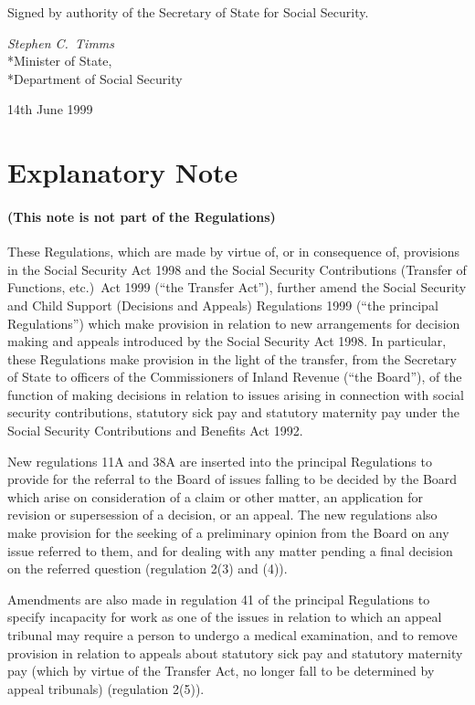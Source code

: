 \documentclass[12pt,a4paper]{article}
\begin{document}

\bigskip

Signed 
by authority of the Secretary of State for Social Security.

{\raggedleft
\emph{Stephen C.\ Timms
}\\*Minister of State,\\*Department of Social Security

}

14th June 1999

\small

\part{Explanatory Note}

\renewcommand\parthead{--- Explanatory Note}

\subsection*{(This note is not part of the Regulations)}

These Regulations, which are made by virtue of, or in consequence of, provisions in the Social Security Act 1998 and the Social Security Contributions (Transfer of Functions, etc.)\ Act 1999 (“the Transfer Act”), further amend the Social Security and Child Support (Decisions and Appeals) Regulations 1999 (“the principal Regulations”) which make provision in relation to new arrangements for decision making and appeals introduced by the Social Security Act 1998. In particular, these Regulations make provision in the light of the transfer, from the Secretary of State to officers of the Commissioners of Inland Revenue (“the Board”), of the function of making decisions in relation to issues arising in connection with social security contributions, statutory sick pay and statutory maternity pay under the Social Security Contributions and Benefits Act 1992.

New regulations 11A and 38A are inserted into the principal Regulations to provide for the referral to the Board of issues falling to be decided by the Board which arise on consideration of a claim or other matter, an application for revision or supersession of a decision, or an appeal. The new regulations also make provision for the seeking of a preliminary opinion from the Board on any issue referred to them, and for dealing with any matter pending a final decision on the referred question (regulation 2(3) and (4)).

Amendments are also made in regulation 41 of the principal Regulations to specify incapacity for work as one of the issues in relation to which an appeal tribunal may require a person to undergo a medical examination, and to remove provision in relation to appeals about statutory sick pay and statutory maternity pay (which by virtue of the Transfer Act, no longer fall to be determined by appeal tribunals) (regulation 2(5)).  
\end{document}
